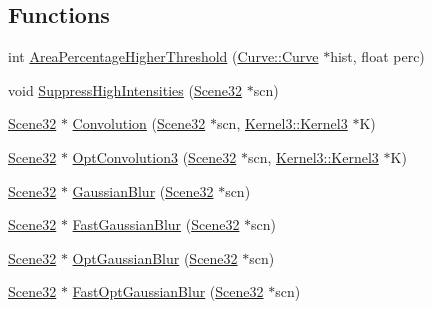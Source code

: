 \subsection*{Functions}
\begin{DoxyCompactItemize}
\item 
int \hyperlink{namespacegft_1_1Scene32_ac4bf08d03e9ba924a7fbc771aa217607}{Area\-Percentage\-Higher\-Threshold} (\hyperlink{namespacegft_1_1Curve_acc891f63f04c17f7b2cafe7ed9ecffdb}{Curve\-::\-Curve} $\ast$hist, float perc)
\item 
void \hyperlink{namespacegft_1_1Scene32_a68349419ee741cafcab98b12c2bc66de}{Suppress\-High\-Intensities} (\hyperlink{namespacegft_1_1Scene32_ae492ac529c9149889605a7bebd647c46}{Scene32} $\ast$scn)
\item 
\hyperlink{namespacegft_1_1Scene32_ae492ac529c9149889605a7bebd647c46}{Scene32} $\ast$ \hyperlink{namespacegft_1_1Scene32_a27fd091dfb7745666599934b91e0e452}{Convolution} (\hyperlink{namespacegft_1_1Scene32_ae492ac529c9149889605a7bebd647c46}{Scene32} $\ast$scn, \hyperlink{namespacegft_1_1Kernel3_a699a3aa3312fdababf590ebcba809922}{Kernel3\-::\-Kernel3} $\ast$K)
\item 
\hyperlink{namespacegft_1_1Scene32_ae492ac529c9149889605a7bebd647c46}{Scene32} $\ast$ \hyperlink{namespacegft_1_1Scene32_a63aecff73ff202ca2ac138d770e92a11}{Opt\-Convolution3} (\hyperlink{namespacegft_1_1Scene32_ae492ac529c9149889605a7bebd647c46}{Scene32} $\ast$scn, \hyperlink{namespacegft_1_1Kernel3_a699a3aa3312fdababf590ebcba809922}{Kernel3\-::\-Kernel3} $\ast$K)
\item 
\hyperlink{namespacegft_1_1Scene32_ae492ac529c9149889605a7bebd647c46}{Scene32} $\ast$ \hyperlink{namespacegft_1_1Scene32_a77bbe5c59983057de88b4a3e2bbd4cc2}{Gaussian\-Blur} (\hyperlink{namespacegft_1_1Scene32_ae492ac529c9149889605a7bebd647c46}{Scene32} $\ast$scn)
\item 
\hyperlink{namespacegft_1_1Scene32_ae492ac529c9149889605a7bebd647c46}{Scene32} $\ast$ \hyperlink{namespacegft_1_1Scene32_a5fbd1a4ddd3b6f8826fec55e95f11478}{Fast\-Gaussian\-Blur} (\hyperlink{namespacegft_1_1Scene32_ae492ac529c9149889605a7bebd647c46}{Scene32} $\ast$scn)
\item 
\hyperlink{namespacegft_1_1Scene32_ae492ac529c9149889605a7bebd647c46}{Scene32} $\ast$ \hyperlink{namespacegft_1_1Scene32_acd1cc6af9e88cef142401a20fb410cbd}{Opt\-Gaussian\-Blur} (\hyperlink{namespacegft_1_1Scene32_ae492ac529c9149889605a7bebd647c46}{Scene32} $\ast$scn)
\item 
\hyperlink{namespacegft_1_1Scene32_ae492ac529c9149889605a7bebd647c46}{Scene32} $\ast$ \hyperlink{namespacegft_1_1Scene32_a5678af5a99d85d659e6d9220a2f6b488}{Fast\-Opt\-Gaussian\-Blur} (\hyperlink{namespacegft_1_1Scene32_ae492ac529c9149889605a7bebd647c46}{Scene32} $\ast$scn)

\end{DoxyCompactItemize}
